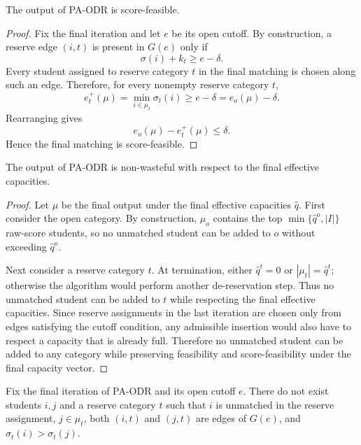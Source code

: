\documentclass[runningheads]{llncs}
\newcommand{\1}{\mathbf{1}}
\begin{document}
\begin{proposition}
The output of PA-ODR is score-feasible.
\end{proposition}

\begin{proof}
Fix the final iteration and let $e$ be its open cutoff. By construction, a reserve edge $(i,t)$ is present in $G(e)$ only if
\[
\sigma(i)+k_t\ge e-\delta.
\]
Every student assigned to reserve category $t$ in the final matching is chosen along such an edge. Therefore, for every nonempty reserve category $t$,
\[
e_t^+(\mu)=\min_{i\in\mu_t}\sigma_t(i)\ge e-\delta=e_o(\mu)-\delta.
\]
Rearranging gives
\[
e_o(\mu)-e_t^+(\mu)\le \delta.
\]
Hence the final matching is score-feasible.
\end{proof}

\begin{proposition}
The output of PA-ODR is non-wasteful with respect to the final effective capacities.
\end{proposition}

\begin{proof}
Let $\mu$ be the final output under the final effective capacities $\hat q$. First consider the open category. By construction, $\mu_o$ contains the top $\min\{\hat q^o,|I|\}$ raw-score students, so no unmatched student can be added to $o$ without exceeding $\hat q^o$.

Next consider a reserve category $t$. At termination, either $\hat q^t=0$ or $|\mu_t|=\hat q^t$; otherwise the algorithm would perform another de-reservation step. Thus no unmatched student can be added to $t$ while respecting the final effective capacities. Since reserve assignments in the last iteration are chosen only from edges satisfying the cutoff condition, any admissible insertion would also have to respect a capacity that is already full. Therefore no unmatched student can be added to any category while preserving feasibility and score-feasibility under the final capacity vector.
\end{proof}

\begin{proposition}
Fix the final iteration of PA-ODR and its open cutoff $e$. There do not exist students $i,j$ and a reserve category $t$ such that $i$ is unmatched in the reserve assignment, $j\in\mu_t$, both $(i,t)$ and $(j,t)$ are edges of $G(e)$, and $\sigma_t(i)>\sigma_t(j)$.
\end{proposition}
\end{document}

